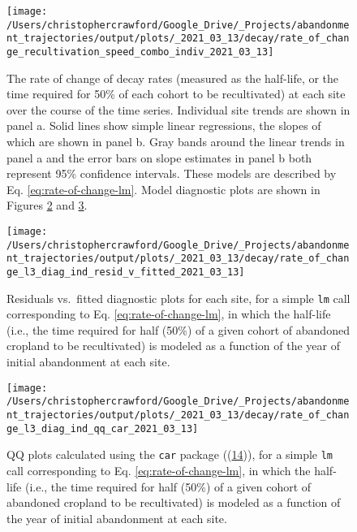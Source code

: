 \documentclass[9pt,lineno]{pnas-new}
\begin{document}
\begin{figure}
\texttt{[image: /Users/christophercrawford/Google\_Drive/\_Projects/abandonment\_trajectories/output/plots/\_2021\_03\_13/decay/rate\_of\_change\_recultivation\_speed\_combo\_indiv\_2021\_03\_13]} \caption{The rate of change of decay rates (measured as the half-life, or the time required for 50\% of each cohort to be recultivated) at each site over the course of the time series. Individual site trends are shown in panel a. Solid lines show simple linear regressions, the slopes of which are shown in panel b. Gray bands around the linear trends in panel a and the error bars on slope estimates in panel b both represent 95\% confidence intervals. These models are described by Eq. \eqref{eq:rate-of-change-lm}. Model diagnostic plots are shown in Figures \ref{fig:rate-of-change-diag-resid-fitted} and \ref{fig:rate-of-change-diag-qq}.}\label{fig:decay-rate-of-change}
\end{figure}



\begin{figure}
\texttt{[image: /Users/christophercrawford/Google\_Drive/\_Projects/abandonment\_trajectories/output/plots/\_2021\_03\_13/decay/rate\_of\_change\_l3\_diag\_ind\_resid\_v\_fitted\_2021\_03\_13]} \caption{Residuals vs.~fitted diagnostic plots for each site, for a simple \texttt{lm} call corresponding to Eq. \eqref{eq:rate-of-change-lm}, in which the half-life (i.e., the time required for half (50\%) of a given cohort of abandoned cropland to be recultivated) is modeled as a function of the year of initial abandonment at each site.}\label{fig:rate-of-change-diag-resid-fitted}
\end{figure}



\begin{figure}
\texttt{[image: /Users/christophercrawford/Google\_Drive/\_Projects/abandonment\_trajectories/output/plots/\_2021\_03\_13/decay/rate\_of\_change\_l3\_diag\_ind\_qq\_car\_2021\_03\_13]} \caption{QQ plots calculated using the \texttt{car} package ((\protect\hyperlink{ref-R-car}{14})), for a simple \texttt{lm} call corresponding to Eq. \eqref{eq:rate-of-change-lm}, in which the half-life (i.e., the time required for half (50\%) of a given cohort of abandoned cropland to be recultivated) is modeled as a function of the year of initial abandonment at each site.}\label{fig:rate-of-change-diag-qq}
\end{figure}
\end{document}
